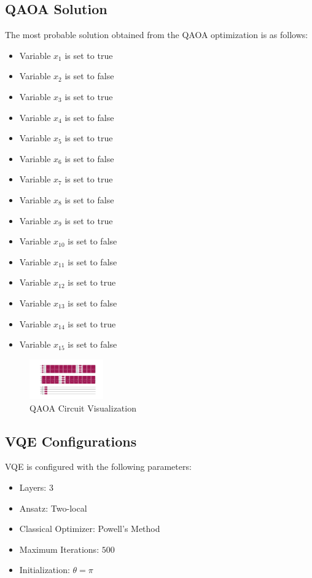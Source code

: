 \documentclass{article}%
\begin{document}
%
\subsection{QAOA Solution}%
\label{subsec:QAOASolution}%
The most probable solution obtained from the QAOA optimization is as follows:\newline%
%
\begin{itemize}%
\item Variable \( x_1 \) is set to true%
\item Variable \( x_2 \) is set to false%
\item Variable \( x_3 \) is set to true%
\item Variable \( x_4 \) is set to false%
\item Variable \( x_5 \) is set to true%
\item Variable \( x_6 \) is set to false%
\item Variable \( x_7 \) is set to true%
\item Variable \( x_8 \) is set to false%
\item Variable \( x_9 \) is set to true%
\item Variable \( x_10 \) is set to false%
\item Variable \( x_11 \) is set to false%
\item Variable \( x_12 \) is set to true%
\item Variable \( x_13 \) is set to false%
\item Variable \( x_14 \) is set to true%
\item Variable \( x_15 \) is set to false%
\end{itemize}

%


\begin{figure}[h!]%
\centering%
\includegraphics[width=120px]{quantum_circuit_qaoa.png}%
\caption{QAOA Circuit Visualization}%
\end{figure}

%
\subsection{VQE Configurations}%
\label{subsec:VQEConfigurations}%
VQE is configured with the following parameters:\newline%
%
\begin{itemize}%
\item%
Layers: \(3\)%
\item%
Ansatz: Two-local%
\item%
Classical Optimizer: Powell's Method%
\item%
Maximum Iterations: \(500\)%
\item%
Initialization: \(\theta = \pi\)%
\end{itemize}
\end{document}
